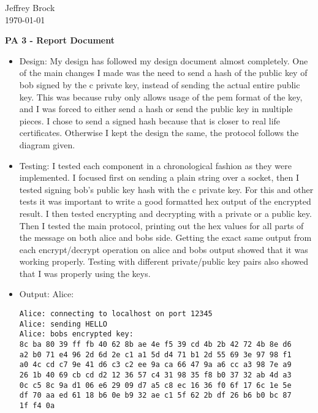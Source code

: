 \documentclass[letterpaper,12pt]{article} \usepackage{fullpage}
\begin{document}
\begin{flushleft}
Jeffrey Brock\\
{\today}\\
\end{flushleft}
\begin{center}
\large\textbf{PA 3 - Report Document}
\end{center}
\begin{itemize}

    \item Design: My design has followed my design document almost completely. One of the main changes I made was the need to send a hash of the public key of bob signed by the c private key, instead of sending the actual entire public key. This was because ruby only allows usage of the pem format of the key, and I was forced to either send a hash or send the public key in multiple pieces. I chose to send a signed hash because that is closer to real life certificates. Otherwise I kept the design the same, the protocol follows the diagram given.

    \item Testing: I tested each component in a chronological fashion as they were implemented. I focused first on sending a plain string over a socket, then I tested signing bob's public key hash with the c private key. For this and other tests it was important to write a good formatted hex output of the encrypted result. I then tested encrypting and decrypting with a private or a public key. Then I tested the main protocol, printing out the hex values for all parts of the message on both alice and bobs side. Getting the exact same output from each encrypt/decrypt operation on alice and bobs output showed that it was working properly. Testing with different private/public key pairs also showed that I was properly using the keys.
    
    \item Output: Alice:
        {\footnotesize
            \singlespacing
            \begin{verbatim}
Alice: connecting to localhost on port 12345
Alice: sending HELLO
Alice: bobs encrypted key: 
8c ba 80 39 ff fb 40 62 8b ae 4e f5 39 cd 4b 2b 42 72 4b 8e d6 
a2 b0 71 e4 96 2d 6d 2e c1 a1 5d d4 71 b1 2d 55 69 3e 97 98 f1 
a0 4c cd c7 9e 41 d6 c3 c2 ee 9a ca 66 47 9a a6 cc a3 98 7e a9 
26 1b 40 69 cb cd d2 12 36 57 c4 31 98 35 f8 b0 37 32 ab 4d a3 
0c c5 8c 9a d1 06 e6 29 09 d7 a5 c8 ec 16 36 f0 6f 17 6c 1e 5e 
df 70 aa ed 61 18 b6 0e b9 32 ae c1 5f 62 2b df 26 b6 b0 bc 87 
1f f4 0a


\end{verbatim}}
\end{itemize}
\end{document}
